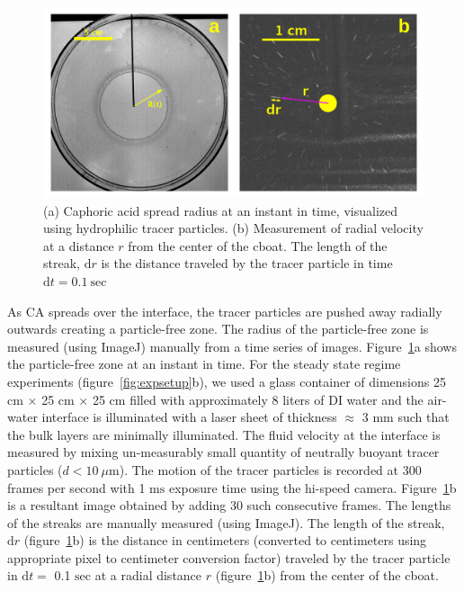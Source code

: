 \documentclass[journal=langd5, manuscript=article, layout=twocolumn]{achemso}
\newcommand{\td}[1]{\mathrm{d}#1}
\begin{document}
\begin{figure}[ht]
    \centering
	\includegraphics[width=\textwidth]{figure2.pdf}	

	\caption{(a) Caphoric acid spread radius at an instant in time, visualized using hydrophilic tracer particles. (b) Measurement of radial velocity at a distance $r$ from the center of the cboat. The length of the streak, $\td{r}$ is the distance traveled by the tracer particle in time $\td{t} = 0.1\ \mathrm{sec}$ }
	\label{fig:statboat}
\end{figure}
As CA spreads over the interface, the tracer particles are pushed away radially outwards creating a particle-free zone. The radius of the particle-free zone is measured (using ImageJ) manually from a time series of images. Figure~\ref{fig:statboat}a shows the particle-free zone at an instant in time. For the steady state regime experiments (figure~\ref{fig:expsetup}b), we used a glass container of dimensions 25 $\mathrm{cm}$ $\times$ 25 $\mathrm{cm}$ $\times$ 25 $\mathrm{cm}$ filled with approximately 8 liters of DI water and the air-water interface is illuminated with a laser sheet of thickness $\approx$ 3 $\mathrm{mm}$ such that the bulk layers are minimally illuminated. The fluid velocity at the interface is measured by mixing un-measurably small quantity of neutrally buoyant tracer particles ($d < 10\ \mu\mathrm{m}$). The motion of the tracer particles is recorded at 300 frames per second with 1 $\mathrm{ms}$ exposure time using the hi-speed camera. Figure~\ref{fig:statboat}b is a resultant image obtained by adding 30 such consecutive frames. The lengths of the streaks are manually measured (using ImageJ). The length of the streak, $\td{r}$ (figure~\ref{fig:statboat}b) is the distance in centimeters (converted to centimeters using appropriate pixel to centimeter conversion factor) traveled by the tracer particle in $\td{t}=$ 0.1 $\mathrm{sec}$ at a radial distance $r$ (figure~\ref{fig:statboat}b) from the center of the cboat. 
\end{document}
